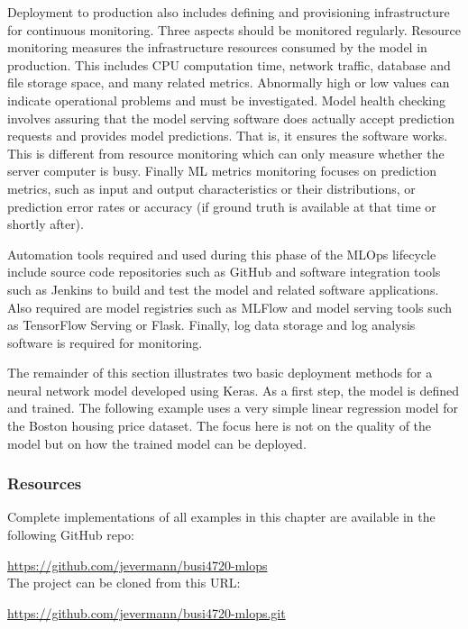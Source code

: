 Deployment to production also includes defining and provisioning infrastructure for continuous monitoring. Three aspects should be monitored regularly. Resource monitoring measures the infrastructure resources consumed by the model in production. This includes CPU computation time, network traffic, database and file storage space, and many related metrics. Abnormally high or low values can indicate operational problems and must be investigated. Model health checking involves assuring that the model serving software does actually accept prediction requests and provides model predictions. That is, it ensures the software works. This is different from resource monitoring which can only measure whether the server computer is busy. Finally ML metrics monitoring focuses on prediction metrics, such as input and output characteristics or their distributions, or prediction error rates or accuracy (if ground truth is available at that time or shortly after). 

Automation tools required and used during this phase of the MLOps lifecycle include source code repositories such as GitHub and software integration tools such as Jenkins to build and test the model and related software applications. Also required are model registries such as MLFlow and model serving tools such as TensorFlow Serving or Flask. Finally, log data storage and log analysis software is required for monitoring. 

The remainder of this section illustrates two basic deployment methods for a neural network model developed using Keras. As a first step, the model is defined and trained. The following example uses a very simple linear regression model for the Boston housing price dataset. The focus here is not on the quality of the model but on how the trained model can be deployed. 

\begin{tcolorbox}[colback=alert]
\subsubsection*{Resources}
Complete implementations of all examples in this chapter are available in the following GitHub repo:

\url{https://github.com/jevermann/busi4720-mlops} \\

The project can be cloned from this URL:

\url{https://github.com/jevermann/busi4720-mlops.git}
\end{tcolorbox}

